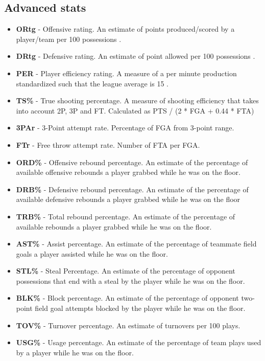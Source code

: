 \documentclass[a4paper]{article}
\begin{document}
\subsection{Advanced stats}
\label{Advanced_stats}

\begin{itemize}
	\item \textbf{ORtg} - Offensive rating. An estimate of points produced/scored by a player/team per 100 possessions \cite{odrt}.
	\item \textbf{DRtg} - Defensive rating. An estimate of point allowed per 100 possessions \cite{odrt}.  
	\item \textbf{PER} - Player efficiency rating. A measure of a per minute production standardized such that the league average is 15 \cite{per}.
	\item \textbf{TS\%} - True shooting percentage. A measure of shooting efficiency that takes into account 2P, 3P and FT. Calculated as  PTS / (2 *  FGA + 0.44 * FTA) 
	\item \textbf{3PAr} - 3-Point attempt rate. Percentage of FGA from 3-point range.
	\item \textbf{FTr} - Free throw attempt rate. Number of FTA per FGA.
	\item \textbf{ORD\%} - Offensive rebound percentage. An estimate of the percentage of available offensive rebounds a player grabbed while he was on the floor.
	\item \textbf{DRB\%} - Defensive rebound percentage. An estimate of the percentage of available defensive rebounds a player grabbed while he was on the floor
	\item \textbf{TRB\%} - Total rebound percentage. An estimate of the percentage of available rebounds a player grabbed while he was on the floor. 
	\item \textbf{AST\%} - Assist percentage. An estimate of the percentage of teammate field goals a player assisted while he was on the floor.
	\item \textbf{STL\%} - Steal Percentage. An estimate of the percentage of opponent possessions that end with a steal by the player while he was on the floor. 
	\item \textbf{BLK\%} - Block percentage. An estimate of the percentage of opponent two-point field goal attempts blocked by the player while he was on the floor. 
	\item \textbf{TOV\%} - Turnover percentage. An estimate of turnovers per 100 plays. 
	\item \textbf{USG\%} - Usage percentage. An estimate of the percentage of team plays used by a player while he was on the floor.  

\end{itemize}
\end{document}
